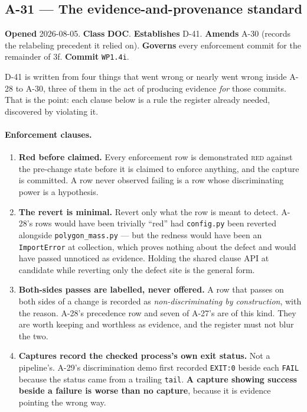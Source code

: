\documentclass[
  10pt,
]{article}
\providecommand{\tightlist}{%
  \setlength{\itemsep}{0pt}\setlength{\parskip}{0pt}}
\begin{document}
\hypertarget{a-31}{%
\subsection{A-31 --- The evidence-and-provenance standard}\label{a-31}}

\textbf{Opened} 2026-08-05. \textbf{Class} \textbf{DOC}. \textbf{Establishes} D-41. \textbf{Amends} A-30 (records the relabeling precedent it relied on). \textbf{Governs} every enforcement commit for the remainder of 3f. \textbf{Commit} \texttt{WP1.4i}.

D-41 is written from four things that went wrong or nearly went wrong inside A-28 to A-30, three of them in the act of producing evidence \emph{for} those commits. That is the point: each clause below is a rule the register already needed, discovered by violating it.

\paragraph{Enforcement clauses.}
\begin{enumerate}
\tightlist
\item \textbf{Red before claimed.} Every enforcement row is demonstrated \textsc{red} against the pre-change state before it is claimed to enforce anything, and the capture is committed. A row never observed failing is a row whose discriminating power is a hypothesis.
\item \textbf{The revert is minimal.} Revert only what the row is meant to detect. A-28's rows would have been trivially ``red'' had \texttt{config.py} been reverted alongside \texttt{polygon\_mass.py} --- but the redness would have been an \texttt{ImportError} at collection, which proves nothing about the defect and would have passed unnoticed as evidence. Holding the shared clause API at candidate while reverting only the defect site is the general form.
\item \textbf{Both-sides passes are labelled, never offered.} A row that passes on both sides of a change is recorded as \emph{non-discriminating by construction}, with the reason. A-28's precedence row and seven of A-27's are of this kind. They are worth keeping and worthless as evidence, and the register must not blur the two.
\item \textbf{Captures record the checked process's own exit status.} Not a pipeline's. A-29's discrimination demo first recorded \texttt{EXIT:0} beside each \texttt{FAIL} because the status came from a trailing \texttt{tail}. \textbf{A capture showing success beside a failure is worse than no capture}, because it is evidence pointing the wrong way.
\end{enumerate}
\end{document}

